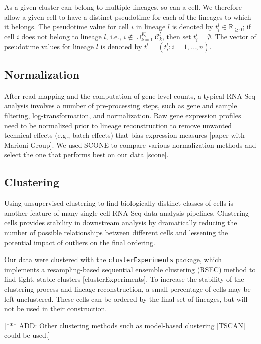 \documentclass[11pt]{article}\usepackage[]{graphicx}\usepackage[]{color}
\begin{document}
 As a given cluster can belong to multiple lineages, so can a cell. We therefore allow a given cell to have a distinct pseudotime for each of the lineages to which it belongs. The pseudotime value for cell $i$ in lineage $l$ is denoted by $t^l_i \in \mathbb{R}_{\geq 0}$; if cell $i$ does not belong to lineage $l$, i.e., $i \notin \cup_{k=1}^{K_l} \mathcal{C}^l_k$, then set $t^l_i = \emptyset$. The vector of pseudotime values for lineage $l$ is denoted by $t^l = (t^l_i: i=1,\ldots,n)$. 

\subsection{Normalization}
\label{s:normalization}
After read mapping and the computation of gene-level counts, a typical RNA-Seq analysis involves a number of pre-processing steps, such as gene and sample filtering, log-transformation, and normalization. Raw gene expression profiles need to be normalized prior to lineage reconstruction to remove unwanted technical effects (e.g., batch effects) that bias expression measures [paper with Marioni Group].  We used SCONE to compare various normalization methods and select the one that performs best on our data [scone].

\subsection{Clustering}
\label{s:clustering}
Using unsupervised clustering to find biologically distinct classes of cells is another feature of many single-cell RNA-Seq data analysis pipelines. Clustering cells provides stability in downstream analysis by dramatically reducing the number of possible relationships between different cells and lessening the potential impact of outliers on the final ordering.

Our data were clustered with the \texttt{clusterExperiments} package, which implements a resampling-based sequential ensemble clustering (RSEC) method to find tight, stable clusters [clusterExperiments]. To increase the stability of the clustering process and lineage reconstruction, a small percentage of cells may be left unclustered. These cells can be ordered by the final set of lineages, but will not be used in their construction.

[*** ADD: Other clustering methods such as model-based clustering [TSCAN] could be used.]
\end{document}
